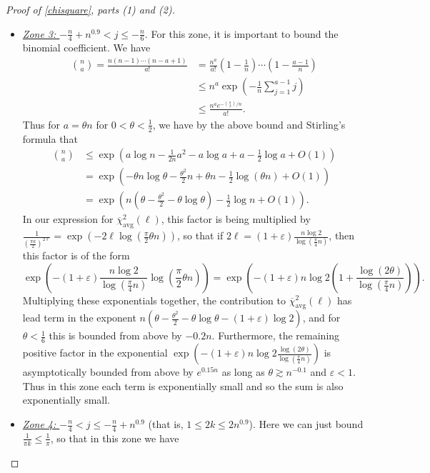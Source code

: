 \documentclass[11pt]{article}
\newcounter{r}
\newcounter{s}
\numberwithin{equation}{section}
\begin{document}
\begin{proof}[Proof of \cref{chisquare}, parts (1) and (2)]
\begin{itemize}
\item \textit{\underline{Zone 3: $-\frac{n}{4} + n^{0.9} < j \le -\frac{n}{6}$}}. For this zone, it is important to bound the binomial coefficient. We have 
\begin{align*}
    \binom{n}{a} = \frac{n(n-1) \cdots (n-a+1)}{a!} &= \frac{n^a}{a!}\left(1 - \frac{1}{n}\right) \cdots \left(1 - \frac{a-1}{n}\right) \\
    &\le n^a \exp\left(-\frac{1}{n} \sum_{j=1}^{a-1} j\right) \\
    &\le \frac{n^a e^{-\binom{a}{2}/n}}{a!}.
\end{align*}
Thus for $a = \theta n$ for $0 < \theta < \frac{1}{2}$, we have by the above bound and Stirling's formula that
\begin{align*}
    \binom{n}{a} &\le \exp\left(a \log n - \frac{1}{2n} a^2 - a \log a + a - \frac{1}{2} \log a +  O(1)\right) \\
    &= \exp\left(-\theta n \log \theta - \frac{\theta^2}{2}n + \theta n - \frac{1}{2} \log(\theta n) + O(1)\right) \\
    &= \exp\left(n\left(\theta - \frac{\theta^2}{2} - \theta \log \theta\right) - \frac{1}{2} \log n + O(1)\right).
\end{align*}
In our expression for $\overline{\chi}_{\text{avg}}^2(\ell)$, this factor is being multiplied by $\frac{1}{\left(\frac{\pi a}{2}\right)^{2\ell}} = \exp\left(-2\ell \log \left(\frac{\pi}{2} \theta n\right)\right)$, so that if $2\ell = (1 + \varepsilon) \frac{n \log 2}{\log\left(\frac{\pi}{4} n\right)}$, then this factor is of the form 
\[
    \exp\left(-(1 + \varepsilon) \frac{n \log 2}{\log\left(\frac{\pi}{4} n\right)}\log \left(\frac{\pi}{2} \theta n\right)\right) = \exp\left(-(1 + \varepsilon) n \log 2  \left(1 + \frac{\log (2\theta)}{\log\left(\frac{\pi}{4} n\right)}\right)\right).
\]
Multiplying these exponentials together, the contribution to $\overline{\chi}_{\text{avg}}^2(\ell)$ has lead term in the exponent $n\left(\theta - \frac{\theta^2}{2} - \theta \log \theta - (1+\varepsilon) \log 2\right)$, and for $\theta < \frac{1}{6}$ this is bounded from above by $-0.2n$. Furthermore, the remaining positive factor in the exponential $\exp\left(-(1 + \varepsilon) n \log 2 \frac{\log (2\theta)}{\log\left(\frac{\pi}{4} n\right)}\right)$ is asymptotically bounded from above by $e^{0.15n}$ as long as $\theta \gtrsim n^{-0.1}$ and $\varepsilon < 1$. Thus in this zone each term is exponentially small and so the sum is also exponentially small.
\item \textit{\underline{Zone 4: $-\frac{n}{4} < j \le -\frac{n}{4} + n^{0.9}$}} (that is, $1 \le 2k \le 2n^{0.9}$). Here we can just bound $\frac{1}{\pi k} \le \frac{1}{\pi}$, so that in this zone we have

\end{itemize}
\end{proof}
\end{document}
